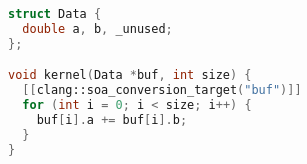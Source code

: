 \begin{lstlisting}[language=C++,
                   label=algorithm:rewrite-demo:vanilla,
                   caption=Element-wise addition of two attributes over an AoS loop,
                   basicstyle=\footnotesize]
struct Data { 
  double a, b, _unused;
};

void kernel(Data *buf, int size) {
  [[clang::soa_conversion_target("buf")]]
  for (int i = 0; i < size; i++) {
    buf[i].a += buf[i].b;
  }
}
\end{lstlisting}
